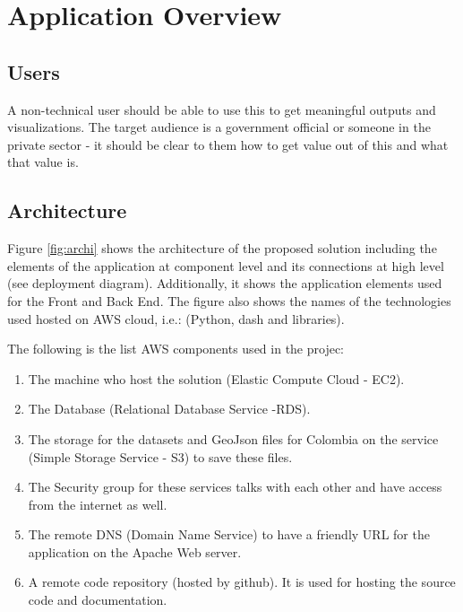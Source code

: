\section{Application Overview}
\label{sec:appOver}


\subsection{Users}
A non-technical user should be able to use this to get meaningful outputs and visualizations. The target audience is a government official or someone in the private sector - it should be clear to them how to get value out of this and what that value is.

\subsection{Architecture}

Figure \ref{fig:archi} shows the architecture of the proposed solution including the elements of the application at component level and its connections at high level (see deployment diagram). Additionally, it shows the application elements used for the Front and Back End. The figure also shows the names of the technologies used hosted on AWS cloud, i.e.: (Python, dash and libraries).   

The following is the list AWS components used in the projec: 
\begin{enumerate}
\item The machine who host the solution (Elastic Compute Cloud - EC2). 
\item The Database  (Relational Database Service -RDS).
\item The storage for the datasets and GeoJson files for Colombia on the service  (Simple Storage Service - S3) to save these files.
\item The Security group for these services talks with each other and have access from the internet as well.
\item The remote DNS (Domain Name Service) to have a friendly URL for the application on the Apache Web server.
\item A remote code repository (hosted by github). It is used for hosting the source code and documentation. 

\end{enumerate}


